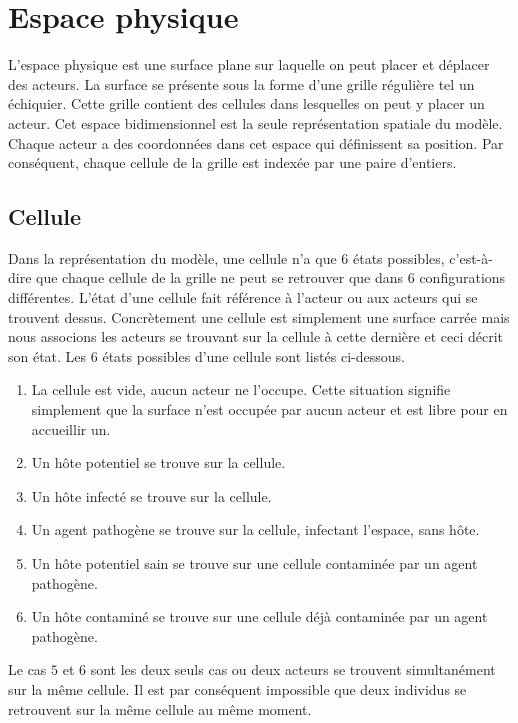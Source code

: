 \section{Espace physique}

L'espace physique est une surface plane sur laquelle on peut placer et déplacer des acteurs. La surface se présente sous la forme d'une grille régulière tel un échiquier. Cette grille contient des cellules dans lesquelles on peut y placer un acteur. Cet espace bidimensionnel est la seule représentation spatiale du modèle. Chaque acteur a des coordonnées dans cet espace qui définissent sa position. Par conséquent, chaque cellule de la grille est indexée par une paire d'entiers.

\subsection{Cellule}

Dans la représentation du modèle, une cellule n'a que $6$ états possibles, c'est-à-dire que chaque cellule de la grille ne peut se retrouver que dans $6$ configurations différentes. L'état d'une cellule fait référence à l'acteur ou aux acteurs qui se trouvent dessus. Concrètement une cellule est simplement une surface carrée mais nous associons les acteurs se trouvant sur la cellule à cette dernière et ceci décrit son état. Les $6$ états possibles d'une cellule sont listés ci-dessous.

\begin{enumerate}
    \item La cellule est vide, aucun acteur ne l'occupe. Cette situation signifie simplement que la surface n'est occupée par aucun acteur et est libre pour en accueillir un.
    \item Un hôte potentiel se trouve sur la cellule.
    \item Un hôte infecté se trouve sur la cellule. 
    \item Un agent pathogène se trouve sur la cellule, infectant l'espace, sans hôte.
    \item Un hôte potentiel sain se trouve sur une cellule contaminée par un agent pathogène.
    \item Un hôte contaminé se trouve sur une cellule déjà contaminée par un agent pathogène.
\end{enumerate}

Le cas $5$ et $6$ sont les deux seuls cas ou deux acteurs se trouvent simultanément sur la même cellule. Il est par conséquent impossible que deux individus se retrouvent sur la même cellule au même moment.

